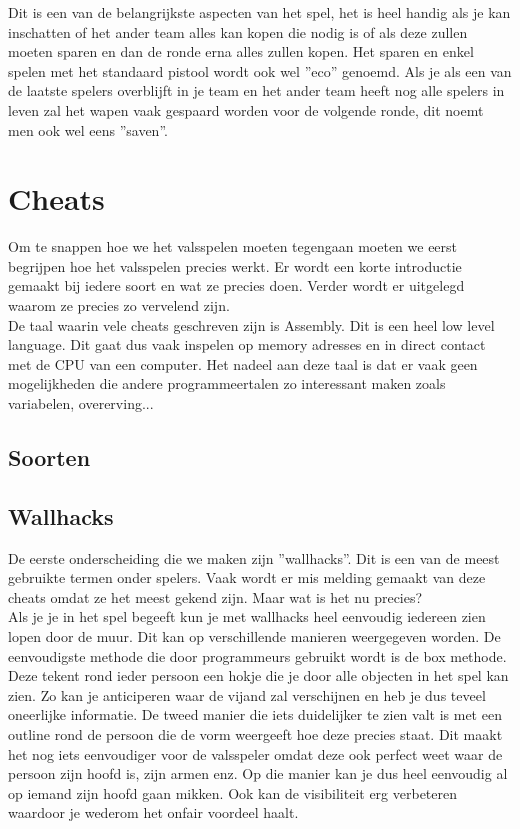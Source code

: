\documentclass[pdftex,a4paper,12pt,twoside]{report}
\begin{document}
Dit is een van de belangrijkste aspecten van het spel, het is heel handig als je kan inschatten of het ander team alles kan kopen die nodig is of als deze zullen moeten sparen en dan de ronde erna alles zullen kopen. Het sparen en enkel spelen met het standaard pistool wordt ook wel ''eco'' genoemd. Als je als een van de laatste spelers overblijft in je team en het ander team heeft nog alle spelers in leven zal het wapen vaak gespaard worden voor de volgende ronde, dit noemt men ook wel eens ''saven''.


\chapter{Cheats}
\label{ch:cheats}

Om te snappen hoe we het valsspelen moeten tegengaan moeten we eerst begrijpen hoe het valsspelen precies werkt. Er wordt een korte introductie gemaakt bij iedere soort en wat ze precies doen. Verder wordt er uitgelegd waarom ze precies zo vervelend zijn.
\\

De taal waarin vele cheats geschreven zijn is Assembly. Dit is een heel low level language. Dit gaat dus vaak inspelen op memory adresses en in direct contact met de CPU van een computer. Het nadeel aan deze taal is dat er vaak geen mogelijkheden die andere programmeertalen zo interessant maken zoals variabelen, overerving...
\citep{assembly}

\section{Soorten}
\label{sec:soorten}
\section{Wallhacks}
\label{sec:walls}
De eerste onderscheiding die we maken zijn ''wallhacks''. Dit is een van de meest gebruikte termen onder spelers. Vaak wordt er mis melding gemaakt van deze cheats omdat ze het meest gekend zijn. Maar wat is het nu precies?
\\

Als je je in het spel begeeft kun je met wallhacks heel eenvoudig iedereen zien lopen door de muur. Dit kan op verschillende manieren weergegeven worden. De eenvoudigste methode die door programmeurs gebruikt wordt is de box methode. Deze tekent rond ieder persoon een hokje die je door alle objecten in het spel kan zien. Zo kan je anticiperen waar de vijand zal verschijnen en heb je dus teveel oneerlijke informatie. 
De tweed manier die iets duidelijker te zien valt is met een outline rond de persoon die de vorm weergeeft hoe deze precies staat. Dit maakt het nog iets eenvoudiger voor de valsspeler omdat deze ook perfect weet waar de persoon zijn hoofd is, zijn armen enz. Op die manier kan je dus heel eenvoudig al op iemand zijn hoofd gaan mikken. Ook kan de visibiliteit erg verbeteren waardoor je wederom het onfair voordeel haalt.
\end{document}

